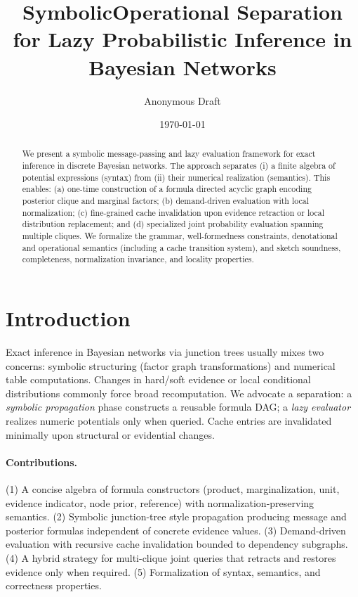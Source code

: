 \documentclass[11pt]{article}
\title{Symbolic\textemdash Operational Separation for Lazy Probabilistic Inference in Bayesian Networks}
\author{Anonymous Draft}
\date{\today}
\begin{document}
\maketitle

\begin{abstract}
We present a symbolic message-passing and lazy evaluation framework for exact inference in discrete Bayesian networks. The approach separates (i) a finite algebra of potential expressions (syntax) from (ii) their numerical realization (semantics). This enables: (a) one-time construction of a formula directed acyclic graph encoding posterior clique and marginal factors; (b) demand-driven evaluation with local normalization; (c) fine-grained cache invalidation upon evidence retraction or local distribution replacement; and (d) specialized joint probability evaluation spanning multiple cliques. We formalize the grammar, well-formedness constraints, denotational and operational semantics (including a cache transition system), and sketch soundness, completeness, normalization invariance, and locality properties.
\end{abstract}

\section{Introduction}
Exact inference in Bayesian networks via junction trees usually mixes two concerns: symbolic structuring (factor graph transformations) and numerical table computations. Changes in hard/soft evidence or local conditional distributions commonly force broad recomputation. We advocate a separation: a \emph{symbolic propagation} phase constructs a reusable formula DAG; a \emph{lazy evaluator} realizes numeric potentials only when queried. Cache entries are invalidated minimally upon structural or evidential changes.

\paragraph{Contributions.} (1) A concise algebra of formula constructors (product, marginalization, unit, evidence indicator, node prior, reference) with normalization-preserving semantics. (2) Symbolic junction-tree style propagation producing message and posterior formulas independent of concrete evidence values. (3) Demand-driven evaluation with recursive cache invalidation bounded to dependency subgraphs. (4) A hybrid strategy for multi-clique joint queries that retracts and restores evidence only when required. (5) Formalization of syntax, semantics, and correctness properties.
\end{document}

